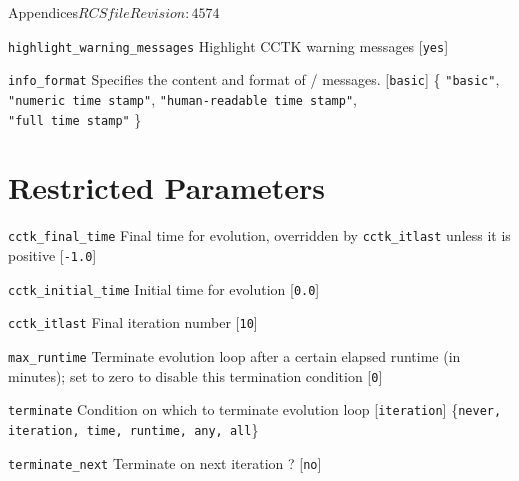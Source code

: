 \begin{cactuspart}{Appendices}{$RCSfile$}{$Revision: 4574 $}
\begin{Lentry}
\item[{\tt highlight\_warning\_messages}]
Highlight CCTK warning messages [{\tt yes}]

\item[{\tt info\_format}]
Specifies the content and format of /
messages. [{\tt basic}]
\{%
\hbox{{\tt "basic"}},
\hbox{{\tt "numeric time stamp"}},
\hbox{{\tt "human-readable time stamp"}},\\
\hbox{{\tt "full time stamp"}}%
\}

\end{Lentry}

\section{Restricted Parameters}

\begin{Lentry}

\item [{\tt cctk\_final\_time}] Final time for evolution, overridden by
{\tt cctk\_itlast} unless it is positive [{\tt -1.0}]

\item[{\tt cctk\_initial\_time}]
Initial time for evolution [{\tt 0.0}]

\item [{\tt cctk\_itlast}]
Final iteration number [{\tt 10}]

\item [{\tt max\_runtime}]
Terminate evolution loop after a certain elapsed runtime (in minutes); set to zero to disable this termination condition [{\tt 0}]

\item [{\tt terminate}]
Condition on which to terminate evolution loop [{\tt iteration}] \{{\tt never, iteration, time, runtime, any, all}\}

\item [{\tt terminate\_next}]
Terminate on next iteration ? [{\tt no}]

\end{Lentry}



\end{cactuspart}
